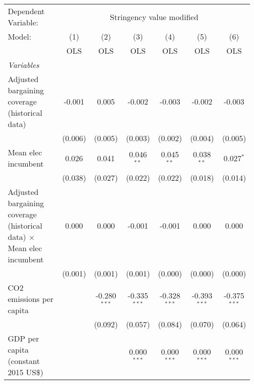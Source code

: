 
\begingroup
\centering
\begin{tabular}{lcccccc}
   \toprule
   Dependent Variable: & \multicolumn{6}{c}{Stringency value modified}\\
   Model:                                                                       & (1)     & (2)            & (3)            & (4)            & (5)            & (6)\\  
                                                                                &  OLS    & OLS            & OLS            & OLS            & OLS            & OLS\\  
   \midrule
   \emph{Variables}\\
   Adjusted bargaining coverage (historical data)                               & -0.001  & 0.005          & -0.002         & -0.003         & -0.002         & -0.003\\   
                                                                                & (0.006) & (0.005)        & (0.003)        & (0.002)        & (0.004)        & (0.005)\\   
   Mean elec incumbent                                                          & 0.026   & 0.041          & 0.046$^{**}$   & 0.045$^{**}$   & 0.038$^{**}$   & 0.027$^{*}$\\   
                                                                                & (0.038) & (0.027)        & (0.022)        & (0.022)        & (0.018)        & (0.014)\\   
   Adjusted bargaining coverage (historical data) $\times$ Mean elec incumbent  & 0.000   & 0.000          & -0.001         & -0.001         & 0.000          & 0.000\\   
                                                                                & (0.001) & (0.001)        & (0.001)        & (0.000)        & (0.000)        & (0.000)\\   
   CO2 emissions per capita                                                     &         & -0.280$^{***}$ & -0.335$^{***}$ & -0.328$^{***}$ & -0.393$^{***}$ & -0.375$^{***}$\\   
                                                                                &         & (0.092)        & (0.057)        & (0.084)        & (0.070)        & (0.064)\\   
   GDP per capita (constant 2015 US\$)                                          &         &                & 0.000$^{***}$  & 0.000$^{***}$  & 0.000$^{***}$  & 0.000$^{***}$\\   

\end{tabular}
